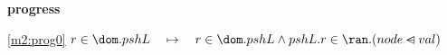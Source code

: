 \textbf{progress}
\begin{block}
\item[ \eqref{m2:prog0} ]$r \in \dom.pshL  \quad \mapsto\quad r \in \dom.pshL \land pshL.r \in \ran.(node \domsub val) $ %
\end{block}
